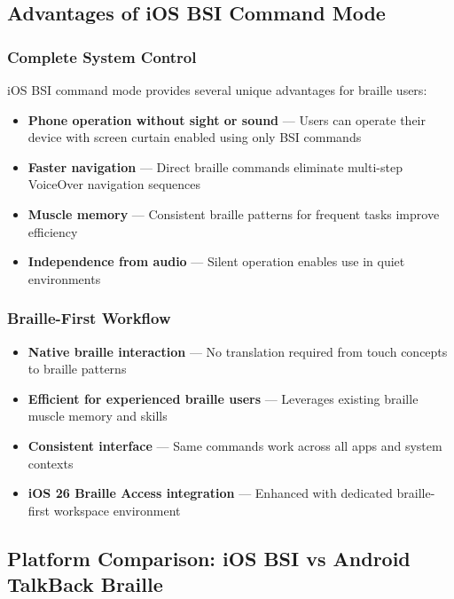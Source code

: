\subsection{Advantages of iOS BSI Command Mode}

\subsubsection{Complete System Control}
iOS BSI command mode provides several unique advantages for braille users:
\begin{itemize}
	\item \textbf{Phone operation without sight or sound} — Users can operate their device with screen curtain enabled using only BSI commands
	\item \textbf{Faster navigation} — Direct braille commands eliminate multi-step VoiceOver navigation sequences
	\item \textbf{Muscle memory} — Consistent braille patterns for frequent tasks improve efficiency
	\item \textbf{Independence from audio} — Silent operation enables use in quiet environments
\end{itemize}

\subsubsection{Braille-First Workflow}
\begin{itemize}
	\item \textbf{Native braille interaction} — No translation required from touch concepts to braille patterns
	\item \textbf{Efficient for experienced braille users} — Leverages existing braille muscle memory and skills
	\item \textbf{Consistent interface} — Same commands work across all apps and system contexts
	\item \textbf{iOS 26 Braille Access integration} — Enhanced with dedicated braille-first workspace environment
\end{itemize}

\subsection{Platform Comparison: iOS BSI vs Android TalkBack Braille}

